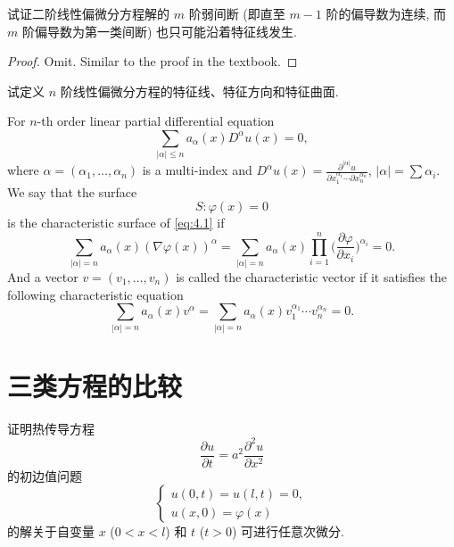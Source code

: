 \begin{exercise}
  试证二阶线性偏微分方程解的 $m$ 阶弱间断 (即直至 $m-1$ 阶的偏导数为连续, 而 $m$ 阶偏导数为第一类间断)
  也只可能沿着特征线发生.
\end{exercise}

\begin{proof}
  Omit. Similar to the proof in the textbook.
\end{proof}


\begin{exercise}
  试定义 $n$ 阶线性偏微分方程的特征线、特征方向和特征曲面.
\end{exercise}

\begin{solution}
  For $n$-th order linear partial differential equation
  \begin{equation}\label{eq:4.2}
    \sum_{|\alpha|\leq n} a_\alpha(x) D^\alpha u(x) = 0,
  \end{equation}
  where $\alpha=(\alpha_1,\ldots,\alpha_n)$ is a multi-index
  and $D^\alpha u(x) = \frac{\partial^{|\alpha|} u}{\partial x_1^{\alpha_1}\cdots\partial x_n^{\alpha_n}}$,
  $|\alpha| = \sum \alpha_i$. We say that the surface
  \begin{equation}\label{eq:4.3}
    S: \varphi(x) = 0
  \end{equation}
  is the characteristic surface of \eqref{eq:4.1} if
  \begin{equation}\label{eq:4.4}
    \sum_{|\alpha|=n} a_\alpha(x) (\nabla\varphi(x))^\alpha
      = \sum_{|\alpha|=n} a_\alpha(x) \prod_{i=1}^n
        \biggl(\frac{\partial\varphi}{\partial x_i}\biggr)^{\alpha_i} = 0.
  \end{equation}
  And a vector $v = (v_1,\ldots,v_n)$ is called the characteristic vector
  if it satisfies the following characteristic equation
  \begin{equation}\label{eq:4.5}
    \sum_{|\alpha|=n} a_\alpha(x) v^\alpha
      = \sum_{|\alpha|=n} a_\alpha(x) v_1^{\alpha_1} \cdots v_n^{\alpha_n} = 0.
  \end{equation}
\end{solution}


\section{三类方程的比较}


\begin{exercise}
  证明热传导方程
  \[\frac{\partial u}{\partial t} = a^2 \frac{\partial^2 u}{\partial x^2}\]
  的初边值问题
  \[\begin{cases}
    u(0, t) = u(l, t) = 0, \\
    u(x, 0) = \varphi(x)
  \end{cases}\]
  的解关于自变量 $x$ ($0<x<l$) 和 $t$ ($t>0$) 可进行任意次微分.
\end{exercise}

